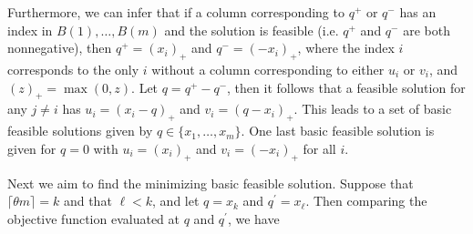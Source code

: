 Furthermore, we can infer that if a column corresponding to $q^{+}$ or $q^{-}$
has an index in $B(1), \dots, B(m)$ and the solution is feasible (i.e. $q^{+}$
and $q^{-}$ are both nonnegative), then $q^{+} = (x_i)_{+}$ and
$q^{-} = (-x_i)_{+}$, where the index $i$ corresponds to the only $i$ without a
column corresponding to either $u_i$ or $v_i$, and $(z)_{+} = \max(0, z)$.  Let
$q = q^{+} - q^{-}$, then it follows that a feasible solution for any $j \ne i$
has $u_i = (x_i - q)_{+}$ and $v_i = (q - x_i)_{+}$.  This leads to a set of
basic feasible solutions given by $q \in \{x_1, \dots, x_m\}$.  One last basic
feasible solution is given for $q = 0$ with $u_i = (x_i)_{+}$ and
$v_i = (-x_i)_{+}$ for all $i$.

Next we aim to find the minimizing basic feasible solution.  Suppose that
$\lceil \theta m \rceil = k$ and that $\ell < k$, and let $q = x_k$ and
$q^{\prime} = x_{\ell}$.  Then comparing the objective function evaluated at $q$
and $q^{\prime}$, we have
